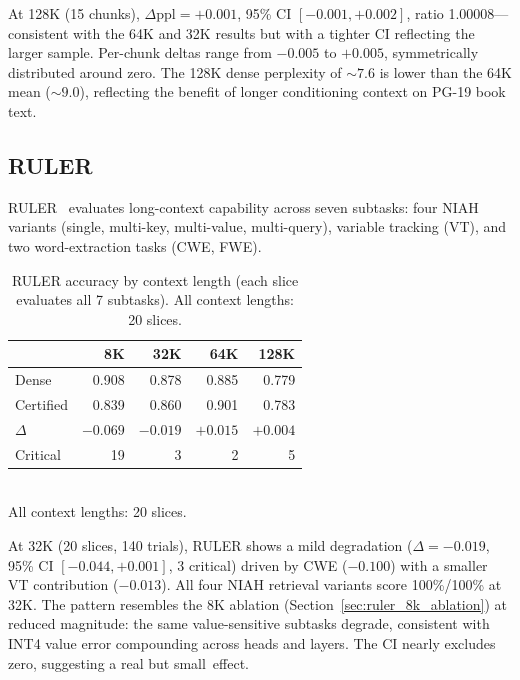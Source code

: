 \documentclass[11pt,a4paper]{article}
\theoremstyle{definition}
\theoremstyle{remark}
\begin{document}
At 128K (15 chunks), $\Delta\mathrm{ppl}{=}{+}0.001$, 95\% CI $[-0.001, +0.002]$, ratio 1.00008---consistent with the 64K and 32K results but with a tighter CI reflecting the larger sample.  Per-chunk deltas range from $-0.005$ to $+0.005$, symmetrically distributed around zero.  The 128K dense perplexity of ${\sim}7.6$ is lower than the 64K mean (${\sim}9.0$), reflecting the benefit of longer conditioning context on PG-19 book text.

\subsection{RULER}

RULER~\cite{ruler} evaluates long-context capability across seven subtasks: four NIAH variants (single, multi-key, multi-value, multi-query), variable tracking (VT), and two word-extraction tasks (CWE, FWE).

\begin{table}[H]
\centering
\caption{RULER accuracy by context length (each slice evaluates all 7 subtasks).  All context lengths: 20 slices.}
\label{tab:ruler}
\small
\begin{tabular}{lrrrr}
\toprule
& \textbf{8K} & \textbf{32K} & \textbf{64K} & \textbf{128K} \\
\midrule
Dense     & 0.908 & 0.878 & 0.885 & 0.779 \\
Certified & 0.839 & 0.860 & 0.901 & 0.783 \\
$\Delta$  & $-0.069$ & $-0.019$ & $+0.015$ & $+0.004$ \\
Critical  & 19 & 3 & 2 & 5 \\
\bottomrule
\end{tabular}
\\[2pt]
{\scriptsize All context lengths: 20 slices.}
\end{table}

At 32K (20 slices, 140 trials), RULER shows a mild degradation ($\Delta{=}{-}0.019$, 95\% CI $[-0.044, {+}0.001]$, 3 critical) driven by CWE ($-0.100$) with a smaller VT contribution ($-0.013$).  All four NIAH retrieval variants score 100\%/100\% at 32K\@.  The pattern resembles the 8K ablation (Section~\ref{sec:ruler_8k_ablation}) at reduced magnitude: the same value-sensitive subtasks degrade, consistent with INT4 value error compounding across heads and layers.  The CI nearly excludes zero, suggesting a real but small~effect.
\end{document}
